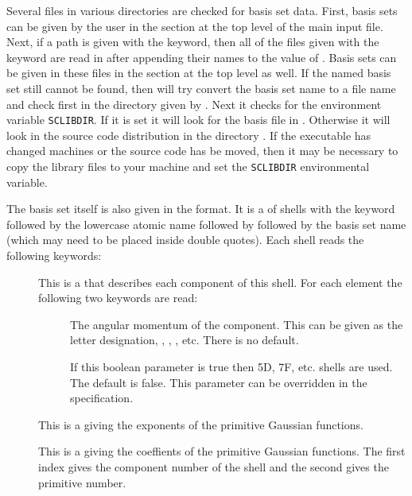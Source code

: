 Several files in various directories are checked for basis set data.
First, basis sets can be given by the user in the  section at
the top level of the main input file.  Next, if a path is given with the
 keyword, then all of the files given with the
 keyword are read in after appending their names to the
value of .  Basis sets can be given in these files in the
 section at the top level as well.  If the named basis set
still cannot be found, then  will try convert the
basis set name to a file name and check first in the directory given by
.  Next it checks for the environment variable
\verb|SCLIBDIR|.  If it is set it will look for the basis file in
.  Otherwise it will look in the source code
distribution in the directory .  If the executable has
changed machines or the source code has be moved, then it may be necessary
to copy the library files to your machine and set the \verb|SCLIBDIR|
environmental variable.

The basis set itself is also given in the  format.
It is a  of shells with the keyword
 followed by the lowercase atomic name followed by \keywd{:}
followed by the basis set name (which may need to be placed inside double
quotes).  Each shell reads the following keywords:
\begin{description}
  \item[] This is a  that describes
    each component of this shell.  For each element the following two
    keywords are read:

  \begin{description}

    \item[] The angular momentum of the component.  This can be
       given as the letter designation, , , ,
       etc.  There is no default.

    \item[] If this boolean parameter is true then 5D, 7F,
       etc. shells are used.  The default is false.  This parameter can be
       overridden in the  specification.

  \end{description}

  \item[]  This is a  giving the
     exponents of the primitive Gaussian functions.

  \item[] This is a  giving the
     coeffients of the primitive Gaussian functions.  The first index gives
     the component number of the shell and the second gives the primitive
     number.

\end{description}

